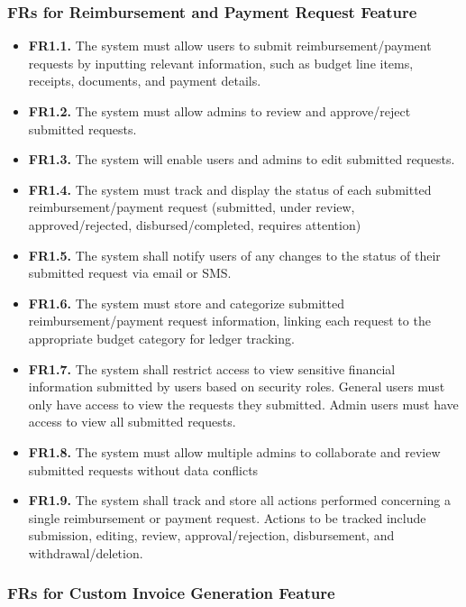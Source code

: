 \documentclass[12pt]{article}
\begin{document}
\subsubsection{FRs for Reimbursement and Payment Request Feature}

\label{FROne}

\begin{itemize}
    \item \textbf{FR1.1.} The system must allow users to submit reimbursement/payment requests by inputting relevant information, such as budget line items, receipts, documents, and payment details.
    \item \textbf{FR1.2.} The system must allow admins to review and approve/reject submitted requests.
    \item \textbf{FR1.3.} The system will enable users and admins to edit submitted requests.
    \item \textbf{FR1.4.} The system must track and display the status of each submitted reimbursement/payment request (submitted, under review, approved/rejected, disbursed/completed, requires attention)
    \item \textbf{FR1.5.} The system shall notify users of any changes to the status of their submitted request via email or SMS.
    \item \textbf{FR1.6.} The system must store and categorize submitted reimbursement/payment request information, linking each request to the appropriate budget category for ledger tracking.
    \item \textbf{FR1.7.} The system shall restrict access to view sensitive financial information submitted by users based on security roles. General users must only have access to view the requests they submitted. Admin users must have access to view all submitted requests.
    \item \textbf{FR1.8.} The system must allow multiple admins to collaborate and review submitted requests without data conflicts
    \item \textbf{FR1.9.} The system shall track and store all actions performed concerning a single reimbursement or payment request. Actions to be tracked include submission, editing, review, approval/rejection, disbursement, and withdrawal/deletion.
\end{itemize}

\subsubsection{FRs for Custom Invoice Generation Feature}
\end{document}
